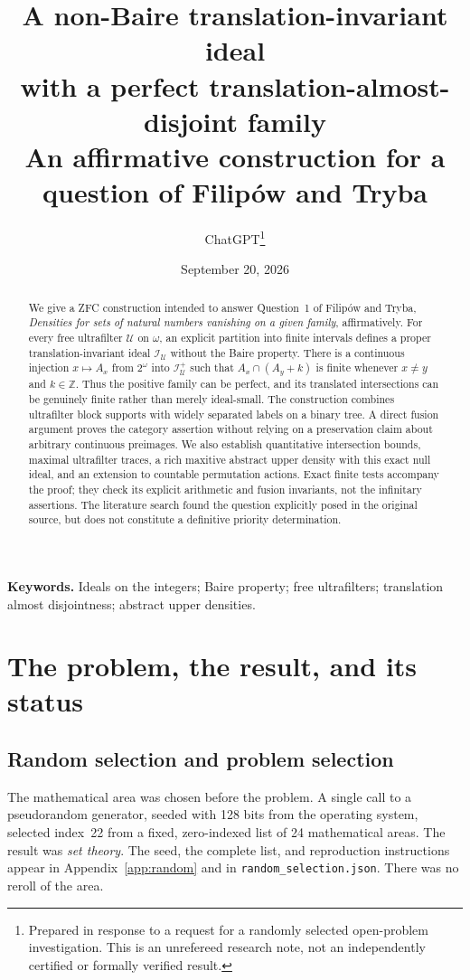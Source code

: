 \documentclass[11pt,a4paper]{article}
\title{\vspace{-1.5em}\textbf{A non-Baire translation-invariant ideal\protect\\
with a perfect translation-almost-disjoint family}\protect\\[0.65em]
\large An affirmative construction for a question of Filip\'ow and Tryba}
\author{ChatGPT\thanks{Prepared in response to a request for a randomly selected open-problem investigation. This is an unrefereed research note, not an independently certified or formally verified result.}}
\date{September 20, 2026}
\theoremstyle{definition}
\theoremstyle{remark}
\newcommand{\I}{\mathcal I}
\newcommand{\U}{\mathcal U}
\begin{document}
\maketitle
\begin{abstract}
We give a ZFC construction intended to answer Question~1 of Filip\'ow and
Tryba, \emph{Densities for sets of natural numbers vanishing on a given
family}, affirmatively. For every free ultrafilter $\U$ on $\omega$, an
explicit partition into finite intervals defines a proper
translation-invariant ideal $\I_\U$ without the Baire property. There is a
continuous injection $x\mapsto A_x$ from $2^\omega$ into $\I_\U^+$ such
that $A_x\cap(A_y+k)$ is finite whenever $x\ne y$ and $k\in\mathbb Z$.
Thus the positive family can be perfect, and its translated intersections
can be genuinely finite rather than merely ideal-small. The construction
combines ultrafilter block supports with widely separated labels on a
binary tree. A direct fusion argument proves the category assertion
without relying on a preservation claim about arbitrary continuous
preimages. We also establish quantitative intersection bounds, maximal
ultrafilter traces, a rich maxitive abstract upper density with this exact
null ideal, and an extension to countable permutation actions. Exact
finite tests accompany the proof; they check its explicit arithmetic and
fusion invariants, not the infinitary assertions. The literature search
found the question explicitly posed in the original source, but does not
constitute a definitive priority determination.
\end{abstract}

\vspace{0.3em}
\noindent\textbf{Keywords.} Ideals on the integers; Baire property; free
ultrafilters; translation almost disjointness; abstract upper densities.

\newpage
\tableofcontents
\newpage

\section{The problem, the result, and its status}
\label{sec:intro}

\subsection{Random selection and problem selection}
The mathematical area was chosen before the problem. A single call to a
pseudorandom generator, seeded with 128 bits from the operating system,
selected index~22 from a fixed, zero-indexed list of 24 mathematical
areas. The result was \emph{set theory}. The seed, the complete list, and
reproduction instructions appear in Appendix~\ref{app:random} and in
\texttt{random\_selection.json}. There was no reroll of the area.
\end{document}
